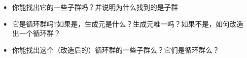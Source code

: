 \documentclass[a4paper, justified]{tufte-handout}
\begin{document}

\begin{ot}[``移动''群-2]	
	\begin{itemize}
	\item 你能找出它的一些子群吗？并说明为什么找到的是子群
	\item 它是循环群吗?如果是，生成元是什么？生成元唯一吗？如果不是，如何改造出一个循环群？
	\item 你能找出这个（改造后的）循环群的一些子群么？它们是循环群么？
	\end{itemize}
\end{ot}




% 




\beginfb

% 
% 
\end{document}
